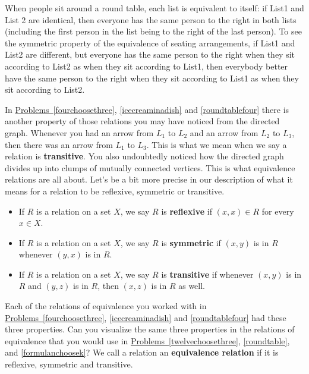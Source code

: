 \documentclass[10pt,]{book}
\newcommand{\terminology}[1]{\textbf{#1}}
\theoremstyle{plain}
\theoremstyle{definition}
\theoremstyle{definition}
\numberwithin{equation}{chapter}
\begin{document}
\par
\hypertarget{p-1931}{}%
When people sit around a round table, each list is equivalent to itself: if List1 and List 2 are identical, then everyone has the same person to the right in both lists (including the first person in the list being to the right of the last person). To see the symmetric property of the equivalence of seating arrangements, if List1 and List2 are different, but everyone has the same person to the right when they sit according to List2 as when they sit according to List1, then everybody better have the same person to the right when they sit according to List1 as when they sit according to List2.%
\par
\hypertarget{p-1932}{}%
In \hyperref[fourchoosethree]{Problems~\ref{fourchoosethree}}, \hyperref[icecreaminadish]{\ref{icecreaminadish}} and \hyperref[roundtablefour]{\ref{roundtablefour}} there is another property of those relations you may have noticed from the directed graph. Whenever you had an arrow from \(L_1\) to \(L_2\) and an arrow from \(L_2\) to \(L_3\), then there was an arrow from \(L_1\) to \(L_3\). This is what we mean when we say a relation is \terminology{transitive}. You also undoubtedly noticed how the directed graph divides up into clumps of mutually connected vertices. This is what equivalence relations are all about. Let's be a bit more precise in our description of what it means for a relation to be reflexive, symmetric or transitive. \leavevmode%
\begin{itemize}[label=\textbullet]
\item{}\hypertarget{p-1933}{}%
If \(R\) is a relation on a set \(X\), we say \(R\) is \terminology{reflexive}  if \((x,x)\in
R\) for every \(x\in X\).%
\item{}\hypertarget{p-1934}{}%
If \(R\) is a relation on a set \(X\), we say \(R\) is \terminology{symmetric} if \((x,y)\) is in \(R\) whenever \((y,x)\) is in \(R\).%
\item{}\hypertarget{p-1935}{}%
If \(R\) is a relation on a set \(X\), we say \(R\) is \terminology{transitive} if whenever \((x,y)\) is in \(R\) and \((y,z)\) is in \(R\), then \((x,z)\) is in \(R\) as well.%
\end{itemize}
%
\par
\hypertarget{p-1936}{}%
Each of the relations of equivalence you worked with in \hyperref[fourchoosethree]{Problems~\ref{fourchoosethree}}, \hyperref[icecreaminadish]{\ref{icecreaminadish}} and \hyperref[roundtablefour]{\ref{roundtablefour}} had these three properties. Can you visualize the same three properties in the relations of equivalence that you would use in \hyperref[twelvechoosethree]{Problems~\ref{twelvechoosethree}}, \hyperref[roundtable]{\ref{roundtable}}, and \hyperref[formulanchoosek]{\ref{formulanchoosek}}? We call a relation an \terminology{equivalence relation} if it is reflexive, symmetric and transitive.%
\end{document}
